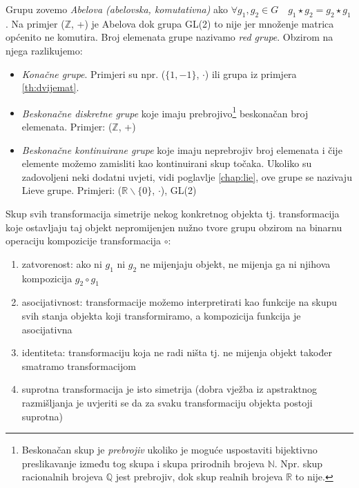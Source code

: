 Grupu zovemo \emph{Abelova (abelovska, komutativna)} ako 
$\forall g_1, g_2 \in G \quad g_1 \star g_2 = g_2 \star g_1$.
Na primjer ($\mathbb{Z}$, +) je Abelova dok grupa GL(2) to nije jer množenje
matrica općenito ne komutira.
Broj elemenata grupe nazivamo \emph{red grupe}. Obzirom na njega razlikujemo:
\begin{itemize}
\item \emph{Konačne grupe}. Primjeri su npr. ($\{1,-1\}$, $\cdot$) ili
    grupa iz primjera \ref{th:dvijemat}.
\item \emph{Beskonačne diskretne grupe} koje imaju 
prebrojivo\footnote{Beskonačan skup je \emph{prebrojiv} ukoliko je moguće uspostaviti
bijektivno preslikavanje između tog skupa i skupa prirodnih brojeva $\mathbb{N}$. Npr. skup
racionalnih brojeva $\mathbb{Q}$ jest prebrojiv, dok skup realnih brojeva
$\mathbb{R}$ to nije.}
beskonačan broj elemenata. Primjer: ($\mathbb{Z}$, +)
\item \emph{Beskonačne kontinuirane grupe} 
koje imaju neprebrojiv broj elemenata i čije elemente možemo
zamisliti kao kontinuirani skup točaka. Ukoliko su zadovoljeni neki dodatni
uvjeti, vidi poglavlje \ref{chap:lie}, ove grupe se nazivaju Lieve grupe. 
Primjeri: ($\mathbb{R}\backslash\{0\}$, $\cdot$), GL(2)
\end{itemize}

\begin{primjer}
Skup svih transformacija simetrije nekog konkretnog objekta tj. transformacija koje ostavljaju
taj objekt nepromijenjen nužno tvore grupu obzirom na binarnu
operaciju kompozicije transformacija $\circ$:
\begin{enumerate}
\item zatvorenost: ako ni $g_1$ ni $g_2$ ne mijenjaju objekt, ne mijenja
   ga ni njihova kompozicija $g_2 \circ g_1$
\item asocijativnost: transformacije možemo interpretirati kao
    funkcije na skupu svih stanja objekta koji transformiramo, a kompozicija funkcija je asocijativna
\item identiteta: transformaciju koja ne radi ništa tj. ne mijenja objekt
      također smatramo transformacijom
\item suprotna transformacija je isto simetrija (dobra vježba iz apstraktnog
    razmišljanja je uvjeriti se da za svaku transformaciju objekta postoji suprotna)
\end{enumerate}
\end{primjer}

